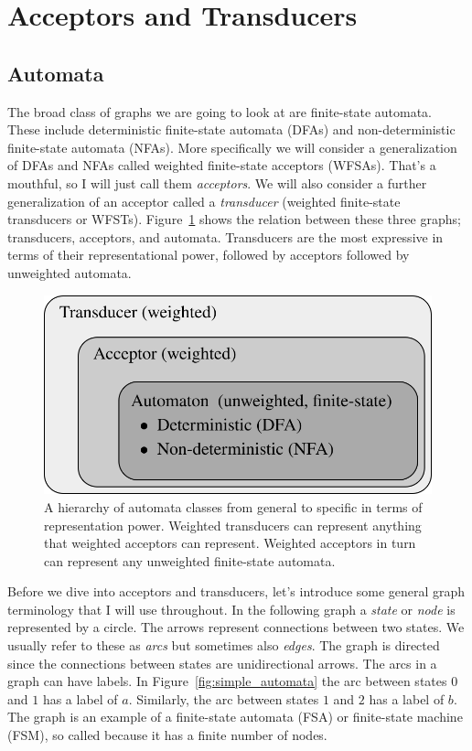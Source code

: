 \section{Acceptors and Transducers}
\label{sec:acceptors_transducers}

\subsection{Automata}
\label{sec:automata}

The broad class of graphs we are going to look at are finite-state automata.
These include deterministic finite-state automata (DFAs) and non-deterministic
finite-state automata (NFAs). More specifically we will consider a
generalization of DFAs and NFAs called weighted finite-state acceptors (WFSAs).
That's a mouthful, so I will just call them \emph{acceptors}. We will also
consider a further generalization of an acceptor called a \emph{transducer}
(weighted finite-state transducers or WFSTs). Figure~\ref{fig:wfsa_classes}
shows the relation between these three graphs; transducers, acceptors, and
automata. Transducers are the most expressive in terms of their
representational power, followed by acceptors followed by unweighted automata.

\begin{figure}
    \centering
    \includegraphics[width=0.7\linewidth]{figures/wfsa_classes}
    \caption{A hierarchy of automata classes from general to specific in terms
    of representation power. Weighted transducers can represent anything that
    weighted acceptors can represent. Weighted acceptors in turn can represent
    any unweighted finite-state automata.}
    \label{fig:wfsa_classes}
\end{figure}

Before we dive into acceptors and transducers, let's introduce some general
graph terminology that I will use throughout. In the following graph a
\emph{state} or \emph{node} is represented by a circle. The arrows represent
connections between two states. We usually refer to these as \emph{arcs} but
sometimes also \emph{edges}. The graph is directed since the connections
between states are unidirectional arrows. The arcs in a graph can have labels.
In Figure~\ref{fig:simple_automata} the arc between states $0$ and $1$ has a
label of $a$. Similarly, the arc between states $1$ and $2$ has a label of $b$.
The graph is an example of a finite-state automata (FSA) or finite-state
machine (FSM), so called because it has a finite number of nodes.

